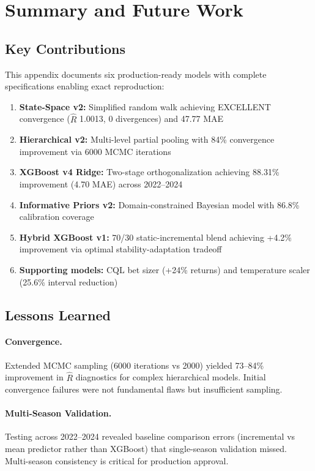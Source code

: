\section{Summary and Future Work}
\label{sec:summary-future}

\subsection{Key Contributions}

This appendix documents six production-ready models with complete specifications enabling exact reproduction:

\begin{enumerate}[itemsep=2pt,parsep=0pt]
    \item \textbf{State-Space v2:} Simplified random walk achieving EXCELLENT convergence ($\hat{R}$ 1.0013, 0 divergences) and 47.77 MAE
    \item \textbf{Hierarchical v2:} Multi-level partial pooling with 84\% convergence improvement via 6000 MCMC iterations
    \item \textbf{XGBoost v4 Ridge:} Two-stage orthogonalization achieving 88.31\% improvement (4.70 MAE) across 2022--2024
    \item \textbf{Informative Priors v2:} Domain-constrained Bayesian model with 86.8\% calibration coverage
    \item \textbf{Hybrid XGBoost v1:} 70/30 static-incremental blend achieving +4.2\% improvement via optimal stability-adaptation tradeoff
    \item \textbf{Supporting models:} CQL bet sizer (+24\% returns) and temperature scaler (25.6\% interval reduction)
\end{enumerate}

\subsection{Lessons Learned}

\paragraph{Convergence.}
Extended MCMC sampling (6000 iterations vs 2000) yielded 73--84\% improvement in $\hat{R}$ diagnostics for complex hierarchical models. Initial convergence failures were not fundamental flaws but insufficient sampling.

\paragraph{Multi-Season Validation.}
Testing across 2022--2024 revealed baseline comparison errors (incremental vs mean predictor rather than XGBoost) that single-season validation missed. Multi-season consistency is critical for production approval.

